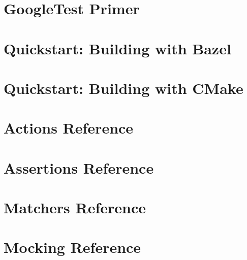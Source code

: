 \let\mypdfximage\pdfximage\def\pdfximage{\immediate\mypdfximage}\documentclass[twoside]{book}
\newcommand{\+}{\discretionary{\mbox{\scriptsize$\hookleftarrow$}}{}{}}
\begin{document}
\chapter{Google\+Test Primer}
\label{md__home_omar_SEP25_build__deps_googletest_src_docs_primer}

\chapter{Quickstart\+: Building with Bazel}
\label{md__home_omar_SEP25_build__deps_googletest_src_docs_quickstart_bazel}

\chapter{Quickstart\+: Building with CMake}
\label{md__home_omar_SEP25_build__deps_googletest_src_docs_quickstart_cmake}

\chapter{Actions Reference}
\label{md__home_omar_SEP25_build__deps_googletest_src_docs_reference_actions}

\chapter{Assertions Reference}
\label{md__home_omar_SEP25_build__deps_googletest_src_docs_reference_assertions}

\chapter{Matchers Reference}
\label{md__home_omar_SEP25_build__deps_googletest_src_docs_reference_matchers}

\chapter{Mocking Reference}
\label{md__home_omar_SEP25_build__deps_googletest_src_docs_reference_mocking}

\end{document}
